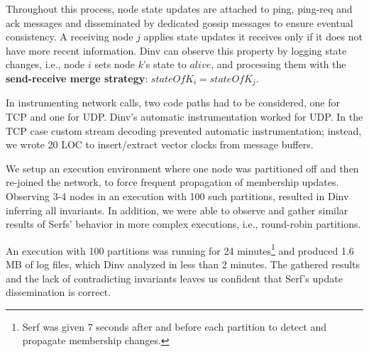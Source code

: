 Throughout this process, node state updates are attached to ping,
ping-req and ack messages and disseminated by dedicated gossip
messages to ensure eventual consistency.
A receiving node $j$ applies state updates it receives only if it does
not have more recent information. Dinv can observe this property by
logging state changes, i.e., node $i$ sets node $k$'s state to
$alive$, and processing them with the \textbf{send-receive merge
  strategy}: $stateOfK_i = stateOfK_j$.

In instrumenting network calls, two code paths had to be considered,
one for TCP and one for UDP.
%
Dinv's automatic instrumentation worked for UDP.
%
In the TCP case custom stream decoding prevented automatic
instrumentation; instead, we wrote 20 LOC to insert/extract vector
clocks from message buffers.

We setup an execution environment where one node was partitioned off and
then re-joined the network, to force frequent propagation of membership
updates. Observing 3-4 nodes in an execution with 100 such partitions,
resulted in Dinv inferring all invariants.
%
In addition, we were able to observe and gather similar results of
Serfs' behavior in more complex executions, i.e., round-robin
partitions.


%
An execution with 100 partitions was running for 24
minutes\footnote{Serf was given 7 seconds after and before each
  partition to detect and propagate membership changes.} and produced
1.6 MB of log files, which Dinv analyzed in less than 2 minutes.
%
The gathered results and the lack of contradicting invariants leaves
us confident that Serf's update dissemination is correct.

